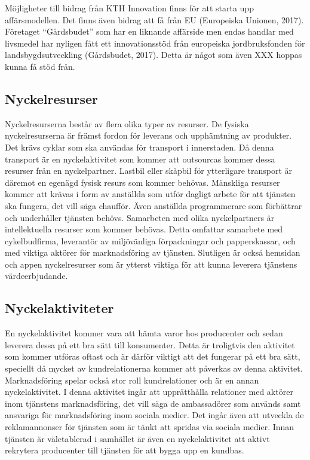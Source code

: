 \documentclass[10pt,a4paper,oneside]{article}
\begin{document}
Möjligheter till bidrag från KTH Innovation finns för att starta upp affärsmodellen. Det finns även bidrag att få från EU (Europeiska Unionen, 2017). Företaget “Gårdsbudet” som har en liknande affärside men endas handlar med livsmedel har nyligen fått ett innovationsstöd från europeiska jordbruksfonden för landsbygdsutveckling (Gårdsbudet, 2017). Detta är något som även XXX hoppas kunna få stöd från.  

\subsection{Nyckelresurser}
Nyckelresurserna består av flera olika typer av resurser. De fysiska nyckelresurserna är främst fordon för leverans och upphämtning av produkter. Det krävs cyklar som ska användas för transport i innerstaden. Då denna transport är en nyckelaktivitet som kommer att outsourcas kommer dessa resurser från en nyckelpartner. Lastbil eller skåpbil för ytterligare transport är däremot en egenägd fysisk resurs som kommer behövas. Mänskliga resurser kommer att krävas i form av anställda som utför dagligt arbete för att tjänsten ska fungera, det vill säga chaufför. Även anställda programmerare som förbättrar och underhåller tjänsten behövs. Samarbeten med olika nyckelpartners är intellektuella resurser som kommer behövas. Detta omfattar samarbete med cykelbudfirma, leverantör av miljövänliga förpackningar och papperskassar, och med viktiga aktörer för marknadsföring av tjänsten.  Slutligen är också hemsidan och appen nyckelresurser som är ytterst viktiga för att kunna leverera tjänstens värdeerbjudande. 

\subsection{Nyckelaktiviteter}
En nyckelaktivitet kommer vara att hämta varor hos producenter och sedan leverera dessa på ett bra sätt till konsumenter. Detta är troligtvis den aktivitet som kommer utföras oftast och är därför viktigt att det fungerar på ett bra sätt, speciellt då mycket av kundrelationerna kommer att påverkas av denna aktivitet. Marknadsföring spelar också stor roll kundrelationer och är en annan nyckelaktivitet. I denna aktivitet ingår att upprätthålla relationer med aktörer inom tjänstens marknadsföring, det vill säga de ambassadörer som används samt ansvariga för marknadsföring inom sociala medier. Det ingår även att utveckla de reklamannonser för tjänsten som är tänkt att spridas via sociala medier. Innan tjänsten är väletablerad i samhället är även en nyckelaktivitet att aktivt rekrytera producenter till tjänsten för att bygga upp en kundbas.  
\end{document}
